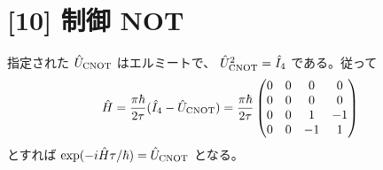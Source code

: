\documentclass[11pt,a4paper]{article}
\begin{document}
\section*{[10] 制御 NOT}
指定された $\hat U_{\rm CNOT}$ はエルミートで、
$\hat U_{\rm CNOT}^2=\hat I_4$ である。従って
\begin{equation}
 \hat H=\frac{\pi\hbar}{2\tau}
       (\hat I_4-\hat U_{\rm CNOT})
 =\frac{\pi\hbar}{2\tau}
 \begin{pmatrix}
  0&0&0&0\\0&0&0&0\\0&0&1&-1\\0&0&-1&1
 \end{pmatrix}
\end{equation}
とすれば $\exp(-i\hat H\tau/\hbar)=\hat U_{\rm CNOT}$ となる。
\end{document}
